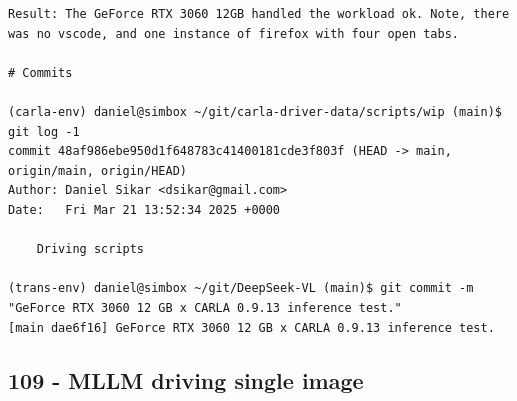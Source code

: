 \begin{verbatim}
Result: The GeForce RTX 3060 12GB handled the workload ok. Note, there was no vscode, and one instance of firefox with four open tabs.

# Commits

(carla-env) daniel@simbox ~/git/carla-driver-data/scripts/wip (main)$ git log -1
commit 48af986ebe950d1f648783c41400181cde3f803f (HEAD -> main, origin/main, origin/HEAD)
Author: Daniel Sikar <dsikar@gmail.com>
Date:   Fri Mar 21 13:52:34 2025 +0000

    Driving scripts

(trans-env) daniel@simbox ~/git/DeepSeek-VL (main)$ git commit -m "GeForce RTX 3060 12 GB x CARLA 0.9.13 inference test."
[main dae6f16] GeForce RTX 3060 12 GB x CARLA 0.9.13 inference test.

\end{verbatim}

\subsection{109 - MLLM driving single image}
\label{app_res:109}

